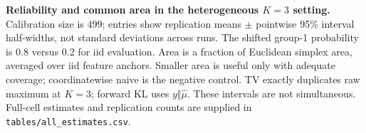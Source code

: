 \textbf{Reliability and common area in the heterogeneous $K=3$ setting.} Calibration size is 499; entries show replication means $\pm$ pointwise 95\% interval half-widths, not standard deviations across runs. The shifted group-1 probability is 0.8 versus 0.2 for iid evaluation. Area is a fraction of Euclidean simplex area, averaged over iid feature anchors. Smaller area is useful only with adequate coverage; coordinatewise naive is the negative control. TV exactly duplicates raw maximum at $K=3$; forward KL uses $y\Vert\hat\mu$. These intervals are not simultaneous. Full-cell estimates and replication counts are supplied in \texttt{tables/all\_estimates.csv}.
